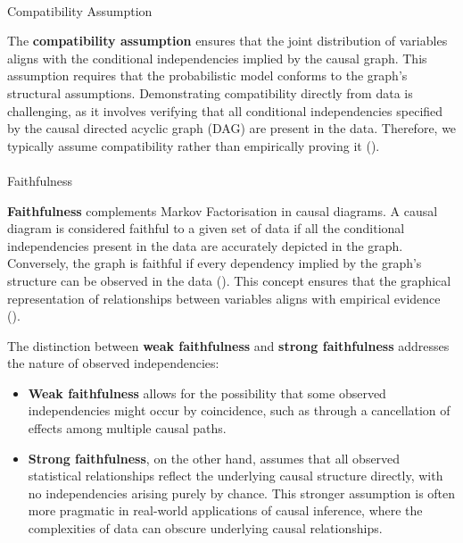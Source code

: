 \documentclass[
  single column]{article}
\makeatletter
\let\oldparagraph\paragraph
\renewcommand{\paragraph}{
    \@ifstar
      \xxxParagraphStar
      \xxxParagraphNoStar
  }
\newcommand{\xxxParagraphStar}[1]{\oldparagraph*{#1}\mbox{}}
\newcommand{\xxxParagraphNoStar}[1]{\oldparagraph{#1}\mbox{}}
\providecommand{\tightlist}{%
  \setlength{\itemsep}{0pt}\setlength{\parskip}{0pt}}\usepackage{longtable,booktabs,array}
\makeatother
\begin{document}
\paragraph{Compatibility Assumption}\label{compatibility-assumption}

The \textbf{compatibility assumption} ensures that the joint
distribution of variables aligns with the conditional independencies
implied by the causal graph. This assumption requires that the
probabilistic model conforms to the graph's structural assumptions.
Demonstrating compatibility directly from data is challenging, as it
involves verifying that all conditional independencies specified by the
causal directed acyclic graph (DAG) are present in the data. Therefore,
we typically assume compatibility rather than empirically proving it
().

\paragraph{Faithfulness}\label{faithfulness}

\textbf{Faithfulness} complements Markov Factorisation in causal
diagrams. A causal diagram is considered faithful to a given set of data
if all the conditional independencies present in the data are accurately
depicted in the graph. Conversely, the graph is faithful if every
dependency implied by the graph's structure can be observed in the data
(). This concept
ensures that the graphical representation of relationships between
variables aligns with empirical evidence
().

The distinction between \textbf{weak faithfulness} and \textbf{strong
faithfulness} addresses the nature of observed independencies:

\begin{itemize}
\tightlist
\item
  \textbf{Weak faithfulness} allows for the possibility that some
  observed independencies might occur by coincidence, such as through a
  cancellation of effects among multiple causal paths.
\item
  \textbf{Strong faithfulness}, on the other hand, assumes that all
  observed statistical relationships reflect the underlying causal
  structure directly, with no independencies arising purely by chance.
  This stronger assumption is often more pragmatic in real-world
  applications of causal inference, where the complexities of data can
  obscure underlying causal relationships.
\end{itemize}
\end{document}
